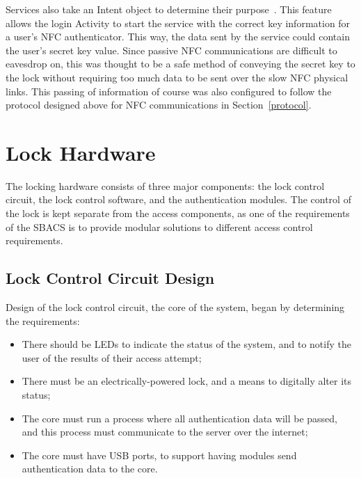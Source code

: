 \documentclass[12pt]{report}
\let\Oldsection\section
\renewcommand{\section}{\FloatBarrier\Oldsection}
\let\Oldsubsection\subsection
\renewcommand{\subsection}{\FloatBarrier\Oldsubsection}
\begin{document}
Services also take an Intent object to determine their purpose~\autocite{ANDROIDINTENT}. This feature allows the login Activity to start
the service with the correct key information for a user's NFC authenticator. This way, the data sent by the service could
contain the user's secret key value. Since passive NFC communications are difficult to eavesdrop on, this was thought to be
a safe method of conveying the secret key to the lock without requiring too much data to be sent over the slow NFC
physical links. This passing of information of course was also configured to follow the protocol designed above for NFC
communications in Section~\ref{protocol}.


\section{Lock Hardware} \label{lock-hardware}


The locking hardware consists of three major components: the lock control circuit, the lock control software, and the 
authentication modules. The control of the lock is kept separate from the access components, as one of the requirements 
of the SBACS is to provide modular solutions to different access control requirements.


\subsection{Lock Control Circuit Design} \label{lock-control-circuit-design}

Design of the lock control circuit, the core of the system, began by determining the requirements:
\begin{itemize}
\item There should be LEDs to indicate the status of the system, and to notify the user of the results of their 
access attempt;
\item There must be an electrically-powered lock, and a means to digitally alter its status;
\item The core must run a process where all authentication data will be passed, and this process must communicate 
to the server over the internet;
\item The core must have USB ports, to support having modules send authentication data to the core.
\end{itemize}
\end{document}
